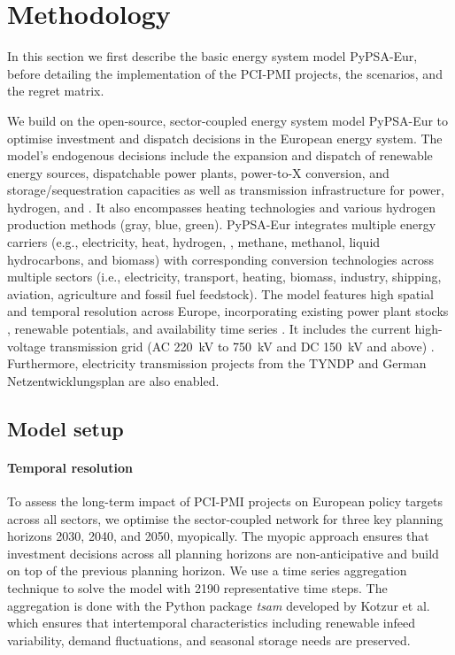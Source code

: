 \documentclass[final,5p,times,twocolumn,sort&compress]{elsarticle}
\begin{document}
\section{Methodology}
\label{sec:methodology}
In this section we first describe the basic energy system model PyPSA-Eur, before detailing the implementation of the PCI-PMI projects, the scenarios, and the regret matrix.

We build on the open-source, sector-coupled energy system model PyPSA-Eur \cite{neumannPotentialRoleHydrogen2023,frysztackiComparisonClusteringMethods2022,glaumOffshorePowerHydrogen2024,horschPyPSAEurOpenOptimisation2018} to optimise investment and dispatch decisions in the European energy system. The model's endogenous decisions include the expansion and dispatch of renewable energy sources, dispatchable power plants, power-to-X conversion, and storage/sequestration capacities as well as transmission infrastructure for power, hydrogen, and . It also encompasses heating technologies and various hydrogen production methods (gray, blue, green).
PyPSA-Eur integrates multiple energy carriers (e.g., electricity, heat, hydrogen, , methane, methanol, liquid hydrocarbons, and biomass) with corresponding conversion technologies across multiple sectors (i.e., electricity, transport, heating, biomass, industry, shipping, aviation, agriculture and fossil fuel feedstock). The model features high spatial and temporal resolution across Europe, incorporating existing power plant stocks \cite{gotzensPerformingEnergyModelling2019}, renewable potentials, and availability time series \cite{hofmannAtliteLightweightPython2021}. It includes the current high-voltage transmission grid (AC \SI{220}{kV} to \SI{750}{kV} and DC \SI{150}{kV} and above) \cite{xiongModellingHighvoltageGrid2025}. Furthermore, electricity transmission projects from the TYNDP  and German Netzentwicklungsplan  are also enabled.

\subsection{Model setup}
\label{sec:model_setup}


\paragraph{Temporal resolution}
\label{sec:temporal_resolution}
To assess the long-term impact of PCI-PMI projects on European policy targets across all sectors, we optimise the sector-coupled network for three key planning horizons 2030, 2040, and 2050, myopically. The myopic approach ensures that investment decisions across all planning horizons are non-anticipative and build on top of the previous planning horizon. We use a time series aggregation technique to solve the model with 2190 representative time steps. The aggregation is done with the Python package \textit{tsam} developed by Kotzur et al. \cite{kotzurImpactDifferentTime2018} which ensures that intertemporal characteristics including renewable infeed variability, demand fluctuations, and seasonal storage needs are preserved.
\end{document}
